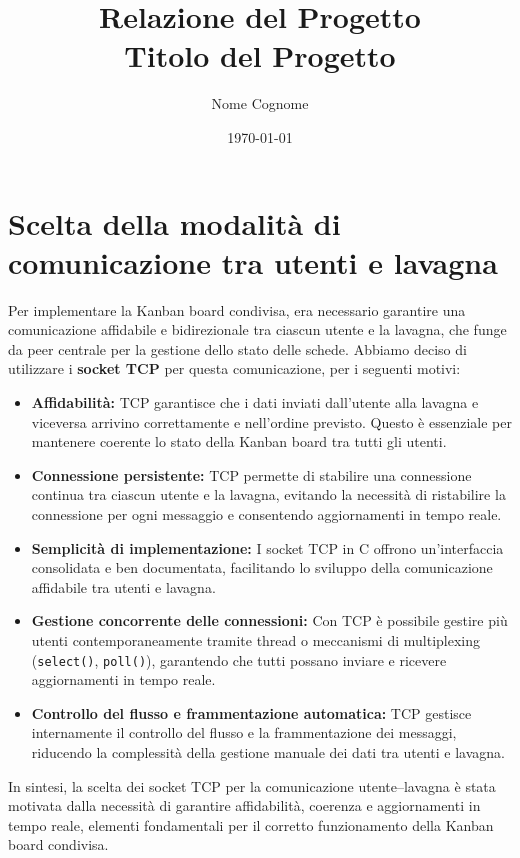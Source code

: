 \documentclass[a4paper,12pt]{article}
\title{Relazione del Progetto \\ \large Titolo del Progetto}
\author{Nome Cognome}
\date{\today}
\begin{document}
\maketitle
\section{Scelta della modalità di comunicazione tra utenti e lavagna}

Per implementare la Kanban board condivisa, era necessario garantire una comunicazione affidabile e bidirezionale tra ciascun utente e la lavagna, che funge da peer centrale per la gestione dello stato delle schede. Abbiamo deciso di utilizzare i \textbf{socket TCP} per questa comunicazione, per i seguenti motivi:

\begin{itemize}
	\item \textbf{Affidabilità:} TCP garantisce che i dati inviati dall'utente alla lavagna e viceversa arrivino correttamente e nell'ordine previsto. Questo è essenziale per mantenere coerente lo stato della Kanban board tra tutti gli utenti.

	\item \textbf{Connessione persistente:} TCP permette di stabilire una connessione continua tra ciascun utente e la lavagna, evitando la necessità di ristabilire la connessione per ogni messaggio e consentendo aggiornamenti in tempo reale.

	\item \textbf{Semplicità di implementazione:} I socket TCP in C offrono un'interfaccia consolidata e ben documentata, facilitando lo sviluppo della comunicazione affidabile tra utenti e lavagna.

	\item \textbf{Gestione concorrente delle connessioni:} Con TCP è possibile gestire più utenti contemporaneamente tramite thread o meccanismi di multiplexing (\texttt{select()}, \texttt{poll()}), garantendo che tutti possano inviare e ricevere aggiornamenti in tempo reale.

	\item \textbf{Controllo del flusso e frammentazione automatica:} TCP gestisce internamente il controllo del flusso e la frammentazione dei messaggi, riducendo la complessità della gestione manuale dei dati tra utenti e lavagna.
\end{itemize}

In sintesi, la scelta dei socket TCP per la comunicazione utente–lavagna è stata motivata dalla necessità di garantire affidabilità, coerenza e aggiornamenti in tempo reale, elementi fondamentali per il corretto funzionamento della Kanban board condivisa.
\end{document}
